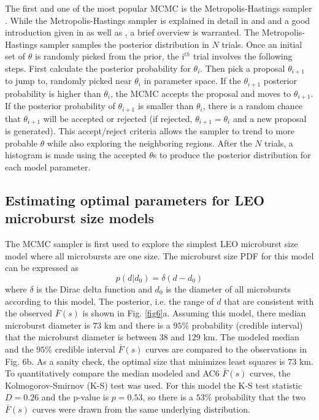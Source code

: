 \documentclass[draft]{agujournal2019}
\begin{document}
The first and one of the most popular MCMC is the Metropolis-Hastings sampler \cite{Metropolis1953, Hastings1970}. While the Metropolis-Hastings sampler is explained in detail in  and  and a good introduction given in  as well as , a brief overview is warranted. The Metropolis-Hastings sampler samples the posterior distribution in $N$ trials. Once an initial set of $\theta$ is randomly picked from the prior, the i$^{th}$ trial involves the following steps. First calculate the posterior probability for $\theta_i$. Then pick a proposal $\theta_{i+1}$ to jump to, randomly picked near $\theta_i$ in parameter space. If the $\theta_{i+1}$ posterior probability is higher than $\theta_i$, the MCMC accepts the proposal and moves to $\theta_{i+1}$. If the posterior probability of $\theta_{i+1}$ is smaller than $\theta_{i}$, there is a random chance that $\theta_{i+1}$ will be accepted or rejected (if rejected, $\theta_{i+1} = \theta_i$ and a new proposal is generated). This accept/reject criteria allows the sampler to trend to more probable $\theta$ while also exploring the neighboring regions. After the $N$ trials, a histogram is made using the accepted $\theta$s to produce the posterior distribution for each model parameter.


\subsection{Estimating optimal parameters for LEO microburst size models}
The MCMC sampler is first used to explore the simplest LEO microburst size model where all microbursts are one size. The microburst size PDF for this model can be expressed as
\begin{equation}
p(d | d_0) = \delta(d-d_0)
\end{equation} where $\delta$ is the Dirac delta function and $d_0$ is the diameter of all microbursts according to this model. The posterior, i.e. the range of $d$ that are consistent with the observed $\bar{F}(s)$ is shown in Fig. \ref{fig6}a. Assuming this model, there median microburst diameter is $73$ km and there is a $95 \%$ probability (credible interval) that the microburst diameter is between 38 and 129 km. The modeled median and the $95 \%$ credible interval $\bar{F}(s)$ curves are compared to the observations in Fig. 6b. As a sanity check, the optimal size that minimizes least squares is 73 km. To quantitatively compare the median modeled and AC6 $\bar{F}(s)$ curves, the Kolmogorov-Smirnov (K-S) test was used. For this model the K-S test statistic $D = 0.26$ and the p-value is $p = 0.53$, so there is a $53 \% $ probability that the two $\bar{F}(s)$ curves were drawn from the same underlying distribution.
\end{document}

